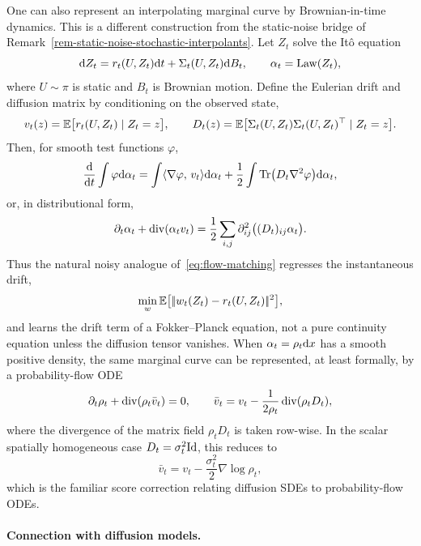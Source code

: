 \begin{rem}\label{rem-noisy-stochastic-interpolants}
One can also represent an interpolating marginal curve by Brownian-in-time dynamics. This is a different construction from the static-noise bridge of Remark~\ref{rem-static-noise-stochastic-interpolants}. Let $Z_t$ solve the It\^o equation
\[
    \mathrm{d} Z_t = r_t(U,Z_t)\mathrm{d} t + \Sigma_t(U,Z_t)\mathrm{d} B_t,
    \qquad \alpha_t=\operatorname{Law}(Z_t),
\]
where $U\sim\pi$ is static and $B_t$ is Brownian motion. Define the Eulerian drift and diffusion matrix by conditioning on the observed state,
\[
    v_t(z)=\mathbb{E}\bigl[r_t(U,Z_t)\mid Z_t=z\bigr],
    \qquad
    D_t(z)=\mathbb{E}\bigl[\Sigma_t(U,Z_t)\Sigma_t(U,Z_t)^\top\mid Z_t=z\bigr].
\]
Then, for smooth test functions $\varphi$,
\[
    \frac{\mathrm{d}}{\mathrm{d} t}\int \varphi\mathrm{d}\alpha_t
    = \int \langle \nabla\varphi,\,v_t\rangle\mathrm{d}\alpha_t
      + \frac12\int \operatorname{Tr}\bigl(D_t\nabla^2\varphi\bigr)\mathrm{d}\alpha_t,
\]
or, in distributional form,
\begin{equation}\label{eq:noisy-interpolant-fokker-planck}
    \partial_t\alpha_t + \operatorname{div}(\alpha_t v_t)
    = \frac12\sum_{i,j}\partial_{ij}^2\bigl((D_t)_{ij}\alpha_t\bigr).
\end{equation}
Thus the natural noisy analogue of~\eqref{eq:flow-matching} regresses the instantaneous drift,
\[
    \min_w \mathbb{E}\bigl[|\!| w_t(Z_t)-r_t(U,Z_t) |\!|^2\bigr],
\]
and learns the drift term of a Fokker--Planck equation, not a pure continuity equation unless the diffusion tensor vanishes. When $\alpha_t=\rho_t\mathrm{d} x$ has a smooth positive density, the same marginal curve can be represented, at least formally, by a probability-flow ODE
\[
    \partial_t\rho_t+\operatorname{div}(\rho_t\bar v_t)=0,
    \qquad
    \bar v_t
    = v_t - \frac{1}{2\rho_t}\operatorname{div}(\rho_t D_t),
\]
where the divergence of the matrix field $\rho_tD_t$ is taken row-wise. In the scalar spatially homogeneous case $D_t=\sigma_t^2\mathrm{Id}$, this reduces to
\[
    \bar v_t = v_t - \frac{\sigma_t^2}{2}\nabla\log\rho_t,
\]
which is the familiar score correction relating diffusion SDEs to probability-flow ODEs.
\end{rem}

\paragraph{Connection with diffusion models.}

